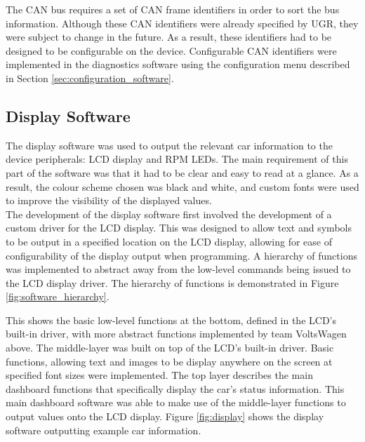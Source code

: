 \documentclass[a4paper,12pt]{article}
\begin{document}
The CAN bus requires a set of CAN frame identifiers in order to sort the bus information. Although these CAN identifiers were already specified by UGR, they were subject to change in the future. As a result, these identifiers had to be designed to be configurable on the device. Configurable CAN identifiers were implemented in the diagnostics software using the configuration menu described in Section \ref{sec:configuration_software}.

\subsection{Display Software}
\label{sec:display_software}

The display software was used to output the relevant car information to the device peripherals: LCD display and RPM LEDs. The main requirement of this part of the software was that it had to be clear and easy to read at a glance. As a result, the colour scheme chosen was black and white, and custom fonts were used to improve the visibility of the displayed values. \\

The development of the display software first involved the development of a custom driver for the LCD display. This was designed to allow text and symbols to be output in a specified location on the LCD display, allowing for ease of configurability of the display output when programming. A hierarchy of functions was implemented to abstract away from the low-level commands being issued to the LCD display driver. The hierarchy of functions is demonstrated in Figure \ref{fig:software_hierarchy}. 



This shows the basic low-level functions at the bottom, defined in the LCD's built-in driver, with more abstract functions implemented by team VoltsWagen above. The middle-layer was built on top of the LCD's built-in driver. Basic functions, allowing text and images to be display anywhere on the screen at specified font sizes were implemented. The top layer describes the main dashboard functions that specifically display the car's status information. This main dashboard software was able to make use of the middle-layer functions to output values onto the LCD display. Figure \ref{fig:display} shows the display software outputting example car information. \\


\end{document}
